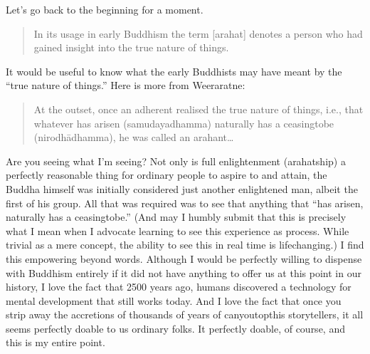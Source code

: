 \documentclass[a5paper,10pt,english]{book}
\begin{document}
\sphinxAtStartPar
Let’s go back to the beginning for a moment.
\begin{quote}

\sphinxAtStartPar
In its usage in early Buddhism the term {[}arahat{]} denotes a person who had gained insight into the true nature of things.
\end{quote}

\sphinxAtStartPar
It would be useful to know what the early Buddhists may have meant by
the “true nature of things.” Here is more from Weeraratne:
\begin{quote}

\sphinxAtStartPar
At the outset, once an adherent realised the true nature of things,
i.e., that whatever has arisen (samudaya\sphinxhyphen{}dhamma) naturally has a
ceasing\sphinxhyphen{}to\sphinxhyphen{}be (nirodhā\sphinxhyphen{}dhamma), he was called an arahant…
\end{quote}

\sphinxAtStartPar
Are you seeing what I’m seeing? Not only is full enlightenment
(arahatship) a perfectly reasonable thing for ordinary people to aspire
to and attain, the Buddha himself was initially considered just another
enlightened man, albeit the first of his group. All that was required
was to see that anything that “has arisen, naturally has a
ceasing\sphinxhyphen{}to\sphinxhyphen{}be.” (And may I humbly submit that this is precisely what I
mean when I advocate learning to see this experience as process. While
trivial as a mere concept, the ability to see this in real time is
life\sphinxhyphen{}changing.) I find this empowering beyond words. Although I would be
perfectly willing to dispense with Buddhism entirely if it did not have
anything to offer us at this point in our history, I love the fact that
2500 years ago, humans discovered a technology for mental development
that still works today. And I love the fact that once you strip away the
accretions of thousands of years of can\sphinxhyphen{}you\sphinxhyphen{}top\sphinxhyphen{}this storytellers, it
all seems perfectly do\sphinxhyphen{}able to us ordinary folks. It  perfectly
do\sphinxhyphen{}able, of course, and this is my entire point.
\end{document}
